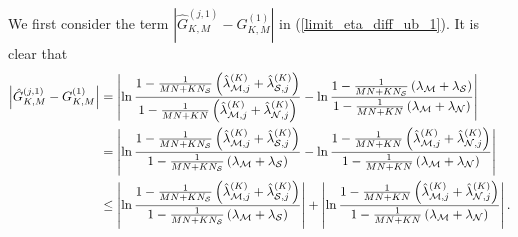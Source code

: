 \documentclass[11pt, draftclsnofoot, onecolumn]{IEEEtran}
\begin{document}
\begin{IEEEproof}
We first consider the term ${| {\hat G_{K,M}^{(j,1)} - G_{K,M}^{(1)}} |}$ in (\ref{limit_eta_diff_ub_1}). It is clear that
\begin{align} \notag
\left| {\hat G_{K,M}^{(j,1)} - G_{K,M}^{(1)}} \right| & = \left| {\ln \frac{{1 - \frac{1}{{MN + K{N_{\cal S}}}}\left( {\hat \lambda _{{\cal M},j}^{(K)} + \hat \lambda _{{\cal S},j}^{(K)}} \right)}}{{1 - \frac{1}{{MN + KN}}\left( {\hat \lambda _{{\cal M},j}^{(K)} + \hat \lambda _{{\cal N},j}^{(K)}} \right)}} - \ln \frac{{1 - \frac{1}{{MN + K{N_{\cal S}}}}\left( {{\lambda _{\cal M}} + {\lambda _{\cal S}}} \right)}}{{1 - \frac{1}{{MN + KN}}\left( {{\lambda _{\cal M}} + {\lambda _{\cal N}}} \right)}}} \right|\\ \notag
& = \left| {\ln \frac{{1 - \frac{1}{{MN + K{N_{\cal S}}}}\left( {\hat \lambda _{{\cal M},j}^{(K)} + \hat \lambda _{{\cal S},j}^{(K)}} \right)}}{{1 - \frac{1}{{MN + K{N_{\cal S}}}}\left( {{\lambda _{\cal M}} + {\lambda _{\cal S}}} \right)}} - \ln \frac{{1 - \frac{1}{{MN + KN}}\left( {\hat \lambda _{{\cal M},j}^{(K)} + \hat \lambda _{{\cal N},j}^{(K)}} \right)}}{{1 - \frac{1}{{MN + KN}}\left( {{\lambda _{\cal M}} + {\lambda _{\cal N}}} \right)}}} \right|\\ \label{G_1_diff_ub}
& \le \left| {\ln \frac{{1 - \frac{1}{{MN + K{N_{\cal S}}}}\left( {\hat \lambda _{{\cal M},j}^{(K)} + \hat \lambda _{{\cal S},j}^{(K)}} \right)}}{{1 - \frac{1}{{MN + K{N_{\cal S}}}}\left( {{\lambda _{\cal M}} + {\lambda _{\cal S}}} \right)}}} \right| + \left| {\ln \frac{{1 - \frac{1}{{MN + KN}}\left( {\hat \lambda _{{\cal M},j}^{(K)} + \hat \lambda _{{\cal N},j}^{(K)}} \right)}}{{1 - \frac{1}{{MN + KN}}\left( {{\lambda _{\cal M}} + {\lambda _{\cal N}}} \right)}}} \right|.
\end{align}


\end{IEEEproof}
\end{document}
